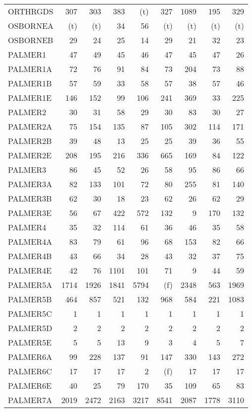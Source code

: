 \documentclass[11pt,twoside]{article}
\begin{document}
{\begin{longtable}[c]{|l|r|r|r|r|r|r|r|r|}
 ORTHRGDS & 307 & 303 & 383 & (t) & 327 & 1089 & 195 & 329 \\
 OSBORNEA & (t) & (t) & 34 & 56 & (t) & (t) & (t) & (t) \\
 OSBORNEB & 29 & 24 & 25 & 14 & 29 & 21 & 32 & 23 \\
 PALMER1 & 47 & 49 & 45 & 46 & 47 & 45 & 47 & 26 \\
 PALMER1A & 72 & 76 & 91 & 84 & 73 & 204 & 73 & 88 \\
 PALMER1B & 57 & 59 & 33 & 58 & 57 & 38 & 57 & 46 \\
 PALMER1E & 146 & 152 & 99 & 106 & 241 & 369 & 33 & 225 \\
 PALMER2 & 30 & 31 & 58 & 29 & 30 & 83 & 30 & 27 \\
 PALMER2A & 75 & 154 & 135 & 87 & 105 & 302 & 114 & 171 \\
 PALMER2B & 39 & 48 & 13 & 25 & 25 & 39 & 36 & 55 \\
 PALMER2E & 208 & 195 & 216 & 336 & 665 & 169 & 84 & 122 \\
 PALMER3 & 86 & 45 & 52 & 26 & 58 & 95 & 86 & 66 \\
 PALMER3A & 82 & 133 & 101 & 72 & 80 & 255 & 81 & 140 \\
 PALMER3B & 62 & 30 & 18 & 23 & 62 & 26 & 62 & 29 \\
 PALMER3E & 56 & 67 & 422 & 572 & 132 & 9 & 170 & 132 \\
 PALMER4 & 35 & 32 & 114 & 61 & 36 & 46 & 35 & 58 \\
 PALMER4A & 83 & 79 & 61 & 96 & 68 & 153 & 82 & 66 \\
 PALMER4B & 43 & 66 & 34 & 28 & 43 & 32 & 37 & 75 \\
 PALMER4E & 42 & 76 & 1101 & 101 & 71 & 9 & 44 & 59 \\
 PALMER5A & 1714 & 1926 & 1841 & 5794 & (f) & 2348 & 563 & 1969 \\
 PALMER5B & 464 & 857 & 521 & 132 & 968 & 584 & 221 & 1083 \\
 PALMER5C & 1 & 1 & 1 & 1 & 1 & 1 & 1 & 1 \\
 PALMER5D & 2 & 2 & 2 & 2 & 2 & 2 & 2 & 2 \\
 PALMER5E & 5 & 5 & 13 & 9 & 3 & 4 & 5 & 7 \\
 PALMER6A & 99 & 228 & 137 & 91 & 147 & 330 & 143 & 272 \\
 PALMER6C & 17 & 17 & 17 & 2 & (f) & 17 & 17 & 17 \\
 PALMER6E & 40 & 25 & 79 & 170 & 35 & 109 & 65 & 83 \\
 PALMER7A & 2019 & 2472 & 2163 & 3217 & 8541 & 2087 & 1778 & 3110 \\

\end{longtable}}
\end{document}
